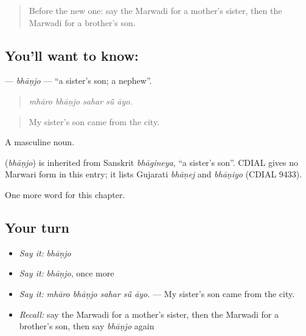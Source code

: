 \label{lesson:MW-C261-bhanjo}



\begin{quote}
Before the new one: say the Marwadi for a mother's sister, then the Marwadi for a brother's son.
\end{quote}

\subsection*{You'll want to know: }
\textbf{} — \emph{bhāṇjo} — \textquotedblleft{}a sister's son; a nephew\textquotedblright{}.

\begin{quote}
    
\end{quote}

\begin{quote}
\emph{mhāro bhāṇjo sahar sū̃ āyo.}
\end{quote}

\begin{quote}
My sister's son came from the city.
\end{quote}

A masculine noun.

\begin{cousinweb}
\textbf{} (\emph{bhāṇjo}) is inherited from Sanskrit \emph{bhāgineya}, \textquotedblleft{}a sister's son\textquotedblright{}. CDIAL gives no Marwari form in this entry; it lists Gujarati \emph{bhāṇej} and \emph{bhāṇiyo} (CDIAL 9433).
\end{cousinweb}

\begin{grammarlens}[title={What you've built}]
One more word for this chapter.
\end{grammarlens}

\subsection*{Your turn}
\begin{itemize}
\raggedright
  \item \emph{Say it:} \emph{bhāṇjo}
  \item \emph{Say it:} \emph{bhāṇjo}, once more
  \item \emph{Say it:} \emph{mhāro bhāṇjo sahar sū̃ āyo.} — My sister's son came from the city.
  \item \emph{Recall:} say the Marwadi for a mother's sister, then the Marwadi for a brother's son, then say \emph{bhāṇjo} again
\end{itemize}

